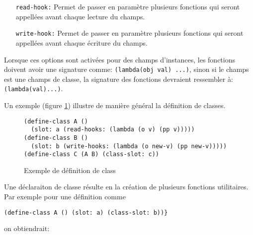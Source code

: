 \documentclass[letterpaper,12pt]{book}
\begin{document}
      \begin{itemize}
      \item[\texttt{read-hook:}] Permet de passer en paramètre
        plusieurs fonctions qui seront appellées avant chaque lecture
        du champs.
      \item[\texttt{write-hook:}] Permet de passer en paramètre
        plusieurs fonctions qui seront appellées avant chaque écriture
        du champs.
      \end{itemize}

      Lorsque ces options sont activées pour des champs d'instances,
      les fonctions doivent avoir une signature comme:
      \texttt{(lambda(obj val) ...)}, sinon si le champs est une
      champs de classe, la signature des fonctions devraient
      ressembler à: \texttt{(lambda(val)...)}.

      Un exemple (figure \ref{ex-defclass}) illustre de manière
      général la définition de classes.

      \begin{figure}[htbp!]
        \begin{lstlisting}
(define-class A () 
  (slot: a (read-hooks: (lambda (o v) (pp v)))))
(define-class B () 
  (slot: b (write-hooks: (lambda (o new-v) (pp new-v)))))
(define-class C (A B) (class-slot: c))
        \end{lstlisting}
        \caption{Exemple de définition de class}
        \label{ex-defclass}
      \end{figure}

      Une déclaraiton de classe résulte en la création de plusieurs
      fonctions utilitaires. Par exemple pour une définition comme
      \begin{lstlisting}
(define-class A () (slot: a) (class-slot: b))}
      \end{lstlisting}
      on obtiendrait:
\end{document}
